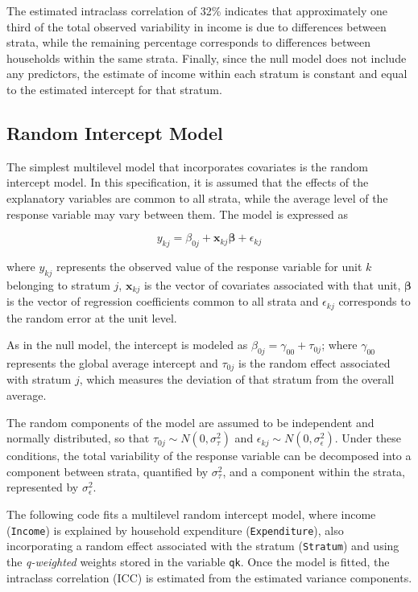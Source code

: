 \documentclass[
  english,
  12pt,
]{book}
\begin{document}
The estimated intraclass correlation of 32\% indicates that approximately one third of the total observed variability in income is due to differences between strata, while the remaining percentage corresponds to differences between households within the same strata. Finally, since the null model does not include any predictors, the estimate of income within each stratum is constant and equal to the estimated intercept for that stratum.

\subsection{Random Intercept Model}\label{sec-intercepto-aleatorio}

The simplest multilevel model that incorporates covariates is the random intercept model. In this specification, it is assumed that the effects of the explanatory variables are common to all strata, while the average level of the response variable may vary between them. The model is expressed as

\[
y_{kj} = \beta_{0j} + \mathbf{x}_{kj}\boldsymbol{\beta} + \epsilon_{kj}
\]

where \(y_{kj}\) represents the observed value of the response variable for unit \(k\) belonging to stratum \(j\), \(\mathbf{x}_{kj}\) is the vector of covariates associated with that unit, \(\boldsymbol{\beta}\) is the vector of regression coefficients common to all strata and \(\epsilon_{kj}\) corresponds to the random error at the unit level.

As in the null model, the intercept is modeled as \(\beta_{0j} = \gamma_{00} + \tau_{0j}\); where \(\gamma_{00}\) represents the global average intercept and \(\tau_{0j}\) is the random effect associated with stratum \(j\), which measures the deviation of that stratum from the overall average.

The random components of the model are assumed to be independent and normally distributed, so that \(\tau_{0j} \sim N(0,\sigma_{\tau}^{2})\) and \(\epsilon_{kj} \sim N(0,\sigma_{\epsilon}^{2})\). Under these conditions, the total variability of the response variable can be decomposed into a component between strata, quantified by \(\sigma_{\tau}^{2}\), and a component within the strata, represented by \(\sigma_{\epsilon}^{2}\).

The following code fits a multilevel random intercept model, where income (\texttt{Income}) is explained by household expenditure (\texttt{Expenditure}), also incorporating a random effect associated with the stratum (\texttt{Stratum}) and using the \emph{q-weighted} weights stored in the variable \texttt{qk}. Once the model is fitted, the intraclass correlation (ICC) is estimated from the estimated variance components.
\end{document}
